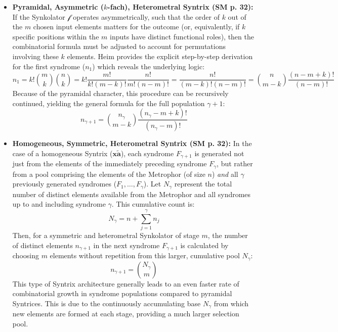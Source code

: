\documentclass[12pt]{article}
\newcommand{\homogeneoussyntrix}{\bm{x\widetilde{a}}}
\newcommand{\synkolator}{\mathcal{f}}
\newcommand{\synkolationsstufe}{m}
\newcommand{\syndrom}{F}
\begin{document}
\begin{itemize}
    \item \textbf{Pyramidal, Asymmetric (\( k \)-fach), Heterometral Syntrix (SM p. 32):}
    If the Synkolator \( \synkolator \) operates asymmetrically, such that the order of \( k \) out of the \( \synkolationsstufe \) chosen input elements matters for the outcome (or, equivalently, if \( k \) specific positions within the \( \synkolationsstufe \) inputs have distinct functional roles), then the combinatorial formula must be adjusted to account for permutations involving these \( k \) elements. Heim provides the explicit step-by-step derivation for the first syndrome (\(n_1\)) which reveals the underlying logic: 
    \begin{equation*}
    n_1 = k! \binom{m}{k}\binom{n}{k} = k! \frac{m!}{k!(m-k)!} \frac{n!}{m!(n-m)!} = \frac{n!}{(m-k)!(n-m)!} = \binom{n}{m-k} \frac{(n-m+k)!}{(n-m)!} 
    \end{equation*}
    Because of the pyramidal character, this procedure can be recursively continued, yielding the general formula for the full population \(\gamma+1\):
    \begin{equation*}
    n_{\gamma+1} = \binom{n_\gamma}{\synkolationsstufe-k} \frac{(n_\gamma-\synkolationsstufe+k)!}{(n_\gamma-\synkolationsstufe)!}
    \end{equation*}

    \item \textbf{Homogeneous, Symmetric, Heterometral Syntrix (SM p. 32):}
    In the case of a homogeneous Syntrix (\(\homogeneoussyntrix\)), each syndrome \( \syndrom_{\gamma+1} \) is generated not just from the elements of the immediately preceding syndrome \( \syndrom_\gamma \), but rather from a pool comprising the elements of the Metrophor (of size \( n \)) \textit{and} all \( \gamma \) previously generated syndromes (\( \syndrom_1, \dots, \syndrom_\gamma \)). Let \( N_\gamma \) represent the total number of distinct elements available from the Metrophor and all syndromes up to and including syndrome \( \gamma \). This cumulative count is:
    \begin{equation*}
    N_\gamma = n + \sum_{j=1}^\gamma n_j
    \end{equation*}
    Then, for a symmetric and heterometral Synkolator of stage \( \synkolationsstufe \), the number of distinct elements \( n_{\gamma+1} \) in the next syndrome \( \syndrom_{\gamma+1} \) is calculated by choosing \( \synkolationsstufe \) elements without repetition from this larger, cumulative pool \( N_\gamma \):
    \begin{equation*}
    n_{\gamma+1} = \binom{N_\gamma}{\synkolationsstufe} 
    \end{equation*}
    This type of Syntrix architecture generally leads to an even faster rate of combinatorial growth in syndrome populations compared to pyramidal Syntrices. This is due to the continuously accumulating base \( N_\gamma \) from which new elements are formed at each stage, providing a much larger selection pool.


\end{itemize}
\end{document}
